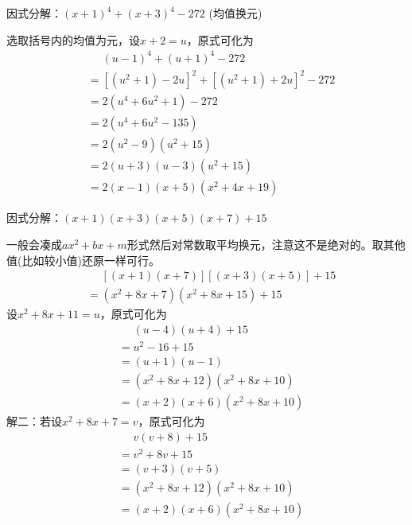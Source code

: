 \documentclass[windows,csize4,answers]{BHCexam}
\begin{document}
\begin{groups}
\begin{questions}[]
        \question[5] 因式分解：$(x+1)^4+(x+3)^4-272$ (均值换元)
        \begin{solution}{0.5cm}
            \methodonly 选取括号内的均值为元，设$x+2=u$，原式可化为
            \[
                \begin{aligned}
                     & \phantom{=}(u-1)^4+(u+1)^4-272        \\
                     & = [(u^2+1)-2u]^2 + [(u^2+1)+2u]^2-272 \\
                     & = 2(u^4+6u^2+1)-272                   \\
                     & = 2(u^4+6u^2-135)                     \\
                     & = 2(u^2-9)(u^2+15)                    \\
                     & = 2(u+3)(u-3)(u^2+15)                 \\
                     & = 2(x-1)(x+5)(x^2+4x+19)
                \end{aligned}
            \]
        \end{solution}
        \vspace{3.5cm}

        \question[5] 因式分解：$(x+1)(x+3)(x+5)(x+7)+15$
        \begin{solution}{0.5cm}
            \methodonly 一般会凑成$ax^2+bx+m$形式然后对常数取平均换元，注意这不是绝对的。取其他值(比如较小值)还原一样可行。
            \[
                \begin{aligned}
                     & \phantom{=}[(x+1)(x+7)][(x+3)(x+5)]+15 \\
                     & = (x^2+8x+7)(x^2+8x+15) +15
                \end{aligned}
            \]
            设$x^2+8x+11=u$，原式可化为
            \[
                \begin{aligned}
                     & \phantom{=}(u-4)(u+4)+15 \\
                     & =  u^2-16+15             \\
                     & = (u+1)(u-1)             \\
                     & = (x^2+8x+12)(x^2+8x+10) \\
                     & = (x+2)(x+6)(x^2+8x+10)
                \end{aligned}
            \]
            解二：若设$x^2+8x+7=v$，原式可化为
            \[
                \begin{aligned}
                     & \phantom{=}v(v+8)+15     \\
                     & =  v^2+8v+15             \\
                     & = (v+3)(v+5)             \\
                     & = (x^2+8x+12)(x^2+8x+10) \\
                     & = (x+2)(x+6)(x^2+8x+10)
                \end{aligned}
            \]
        \end{solution}
        \vspace{3.5cm}


\end{questions}
\end{groups}
\end{document}
